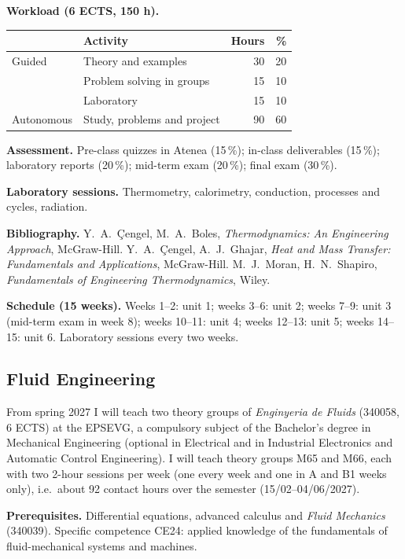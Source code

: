 \documentclass[11pt]{article}
\begin{document}
\textbf{Workload (6 ECTS, 150 h).}
\begin{center}\small
\begin{tabular}{@{}llrr@{}}
\toprule
& Activity & Hours & \% \\ \midrule
Guided & Theory and examples & 30 & 20 \\
       & Problem solving in groups & 15 & 10 \\
       & Laboratory & 15 & 10 \\
Autonomous & Study, problems and project & 90 & 60 \\ \bottomrule
\end{tabular}
\end{center}

\textbf{Assessment.} Pre-class quizzes in Atenea (15\,\%); in-class deliverables
(15\,\%); laboratory reports (20\,\%); mid-term exam (20\,\%); final exam (30\,\%).

\textbf{Laboratory sessions.} Thermometry, calorimetry, conduction, processes and cycles, radiation.

\textbf{Bibliography.} Y.\ A.\ \c{C}engel, M.\ A.\ Boles, \emph{Thermodynamics: An
Engineering Approach}, McGraw-Hill. Y.\ A.\ \c{C}engel, A.\ J.\ Ghajar, \emph{Heat and
Mass Transfer: Fundamentals and Applications}, McGraw-Hill. M.\ J.\ Moran, H.\ N.\
Shapiro, \emph{Fundamentals of Engineering Thermodynamics}, Wiley.

\textbf{Schedule (15 weeks).} Weeks 1--2: unit 1; weeks 3--6: unit 2; weeks
7--9: unit 3 (mid-term exam in week 8); weeks 10--11: unit 4; weeks 12--13: unit
5; weeks 14--15: unit 6. Laboratory sessions every two weeks.

\subsection{Fluid Engineering}\label{sec:ef}
From spring 2027 I will teach two theory groups of \emph{Enginyeria de Fluids} (340058,
6 ECTS) at the EPSEVG, a compulsory subject of the Bachelor's degree in Mechanical
Engineering (optional in Electrical and in Industrial Electronics and Automatic Control
Engineering). I will teach theory groups M65 and M66, each with two 2-hour sessions per week
(one every week and one in A and B1 weeks only), i.e.\ about 92 contact hours over the semester
(15/02--04/06/2027).

\textbf{Prerequisites.} Differential equations, advanced calculus and \emph{Fluid
Mechanics} (340039). Specific competence CE24: applied knowledge of the fundamentals of
fluid-mechanical systems and machines.
\end{document}
